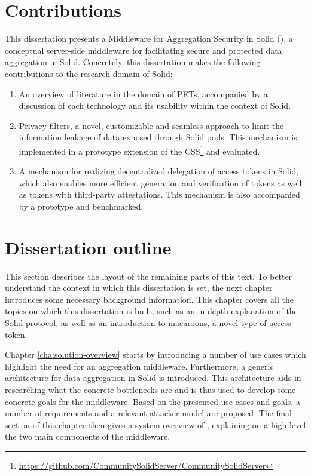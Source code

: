 \section{Contributions}
\label{sec:contributions}
This dissertation presents a Middleware for Aggregation Security in Solid (\middleware{}), a conceptual server-side middleware for facilitating secure and protected data aggregation in Solid. Concretely, this dissertation makes the following contributions to the research domain of Solid:
\begin{enumerate}
    \item An overview of literature in the domain of \acrlong{PETs}, accompanied by a discussion of each technology and its usability within the context of Solid.
    \newpage
    \item Privacy filters, a novel, customizable and seamless approach to limit the information leakage of data exposed through Solid pods. This mechanism is implemented in a prototype extension of the \acrlong{CSS}\footnote{\url{https://github.com/CommunitySolidServer/CommunitySolidServer}} and evaluated.
    \item A mechanism for realizing decentralized delegation of access tokens in Solid, which also enables more efficient generation and verification of tokens as well as tokens with third-party attestations. This mechanism is also accompanied by a prototype and benchmarked.
\end{enumerate}

\section{Dissertation outline}
\label{sec:outline}
This section describes the layout of the remaining parts of this text. To better understand the context in which this dissertation is set, the next chapter introduces some necessary background information. This chapter covers all the topics on which this dissertation is built, such as an in-depth explanation of the Solid protocol, as well as an introduction to macaroons, a novel type of access token. 

Chapter \ref{cha:solution-overview} starts by introducing a number of use cases which highlight the need for an aggregation middleware. Furthermore, a generic architecture for data aggregation in Solid is introduced. This architecture aids in researching what the concrete bottlenecks are and is thus used to develop some concrete goals for the middleware. Based on the presented use cases and goals, a number of requirements and a relevant attacker model are proposed. The final section of this chapter then gives a system overview of \middleware{}, explaining on a high level the two main components of the middleware.

